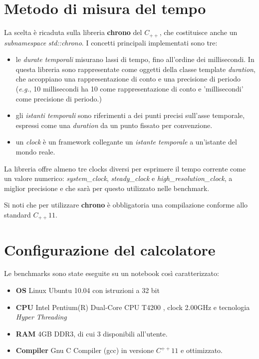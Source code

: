 \section{Metodo di misura del tempo}
La scelta è ricaduta sulla libreria \textbf{chrono} del $C_{++}$, che
costituisce anche un \emph{subnamespace} \emph{std::chrono}.
I concetti principali implementati sono tre:
\begin{itemize}
  \item le \emph{durate temporali} misurano lassi di tempo, fino all'ordine dei
  millisecondi. In questa libreria sono rappresentate come oggetti della classe
  template \emph{duration}, che accoppiano una rappresentazione di conto e una
  precisione di periodo (\emph{e.g.}, 10 millisecondi ha 10 come
  rappresentazione di conto e 'millisecondi' come precisione di periodo.)
  \item gli \emph{istanti temporali} sono riferimenti a dei punti precisi
  sull'asse temporale, espressi come una \emph{duration} da un punto fissato per
  convenzione.
  \item un \emph{clock} è un framework collegante un \emph{istante temporale} a
  un'istante del mondo reale.
\end{itemize}
La libreria offre almeno tre clocks diversi per esprimere il tempo corrente come
un valore numerico: \emph{system\_clock}, \emph{steady\_clock} e
\emph{high\_resolution\_clock}, a miglior precisione e che sarà per questo
utilizzato nelle benchmark.

Si noti che per utilizzare \textbf{chrono} è obbligatoria una compilazione
conforme allo standard $C_{++}11$.
\section{Configurazione del calcolatore}
Le benchmarks sono state eseguite su un notebook così caratterizzato:
\begin{itemize}
  \item \textbf{OS} Linux Ubuntu 10.04 con istruzioni a 32 bit
  \item \textbf{CPU} Intel Pentium(R) Dual-Core CPU T4200 , clock 2.00GHz e
  tecnologia \emph{Hyper Threading}
  \item \textbf{RAM} 4GB DDR3, di cui 3 disponibili all'utente.
  \item \textbf{Compiler} Gnu C Compiler (gcc) in versione $C^{++}11$ e
  ottimizzato.
\end{itemize}
